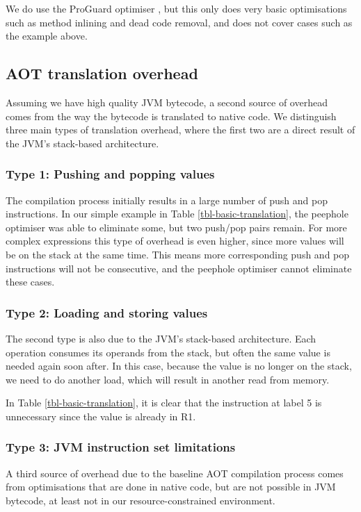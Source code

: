 We do use the ProGuard optimiser \cite{proguard}, but this only does very basic optimisations such as method inlining and dead code removal, and does not cover cases such as the example above.

\subsection{AOT translation overhead}
\label{sec-overhead-aot-translation}
Assuming we have high quality JVM bytecode, a second source of overhead comes from the way the bytecode is translated to native code. We distinguish three main types of translation overhead, where the first two are a direct result of the JVM's stack-based architecture.

\subsubsection{Type 1: Pushing and popping values} The compilation process initially results in a large number of push and pop instructions. In our simple example in Table \ref{tbl-basic-translation}, the peephole optimiser was able to eliminate some, but two push/pop pairs remain. For more complex expressions this type of overhead is even higher, since more values will be on the stack at the same time. This means more corresponding push and pop instructions will not be consecutive, and the peephole optimiser cannot eliminate these cases.

\subsubsection{Type 2: Loading and storing values} The second type is also due to the JVM's stack-based architecture. Each operation consumes its operands from the stack, but often the same value is needed again soon after. In this case, because the value is no longer on the stack, we need to do another load, which will result in another read from memory.

In Table \ref{tbl-basic-translation}, it is clear that the  instruction at label 5 is unnecessary since the value is already in R1.

\subsubsection{Type 3: JVM instruction set limitations} A third source of overhead due to the baseline AOT compilation process comes from optimisations that are done in native code, but are not possible in JVM bytecode, at least not in our resource-constrained environment.

